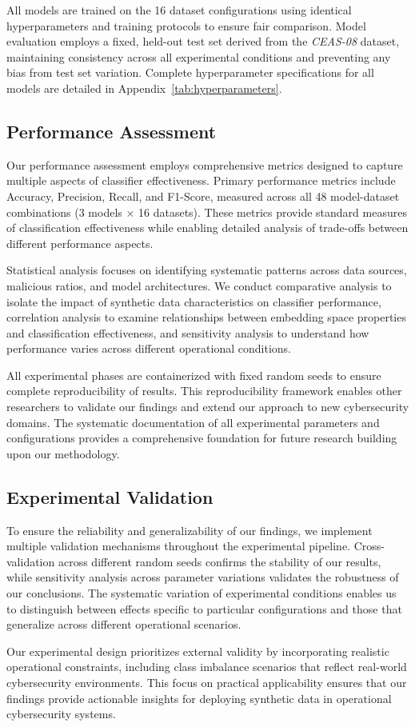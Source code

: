 All models are trained on the 16 dataset configurations using identical hyperparameters and training protocols to ensure fair comparison. Model evaluation employs a fixed, held-out test set derived from the \textit{CEAS-08} dataset, maintaining consistency across all experimental conditions and preventing any bias from test set variation. Complete hyperparameter specifications for all models are detailed in Appendix~\ref{tab:hyperparameters}.

\subsection{Performance Assessment}

Our performance assessment employs comprehensive metrics designed to capture multiple aspects of classifier effectiveness. Primary performance metrics include Accuracy, Precision, Recall, and F1-Score, measured across all 48 model-dataset combinations (3 models × 16 datasets). These metrics provide standard measures of classification effectiveness while enabling detailed analysis of trade-offs between different performance aspects.

Statistical analysis focuses on identifying systematic patterns across data sources, malicious ratios, and model architectures. We conduct comparative analysis to isolate the impact of synthetic data characteristics on classifier performance, correlation analysis to examine relationships between embedding space properties and classification effectiveness, and sensitivity analysis to understand how performance varies across different operational conditions.

All experimental phases are containerized with fixed random seeds to ensure complete reproducibility of results. This reproducibility framework enables other researchers to validate our findings and extend our approach to new cybersecurity domains. The systematic documentation of all experimental parameters and configurations provides a comprehensive foundation for future research building upon our methodology.

\subsection{Experimental Validation}

To ensure the reliability and generalizability of our findings, we implement multiple validation mechanisms throughout the experimental pipeline. Cross-validation across different random seeds confirms the stability of our results, while sensitivity analysis across parameter variations validates the robustness of our conclusions. The systematic variation of experimental conditions enables us to distinguish between effects specific to particular configurations and those that generalize across different operational scenarios.

Our experimental design prioritizes external validity by incorporating realistic operational constraints, including class imbalance scenarios that reflect real-world cybersecurity environments. This focus on practical applicability ensures that our findings provide actionable insights for deploying synthetic data in operational cybersecurity systems.